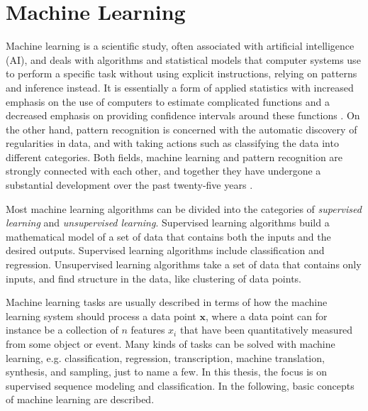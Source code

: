 \documentclass{scrartcl}
\begin{document}




\newpage

\section{Machine Learning}
\label{sec:machine_learning}

Machine learning is a scientific study, often associated with artificial intelligence (AI), and deals with algorithms and statistical models that computer systems use to perform a specific task without using explicit instructions, relying on patterns and inference instead. It is essentially a form of applied statistics with increased emphasis on the use of computers to estimate complicated functions and a decreased emphasis on providing confidence intervals around these functions \cite{Goodfellow2016}. On the other hand, pattern recognition is concerned with the automatic discovery of regularities in data, and with taking actions such as classifying the data into different categories. Both fields, machine learning and pattern recognition are strongly connected with each other, and together they have undergone a substantial development over the past twenty-five years \cite{Bishop2006}.

Most machine learning algorithms can be divided into the categories of \emph{supervised learning} and \emph{unsupervised learning}. Supervised learning algorithms build a mathematical model of a set of data that contains both the inputs and the desired outputs. Supervised learning algorithms include classification and regression. Unsupervised learning algorithms take a set of data that contains only inputs, and find structure in the data, like clustering of data points. 

Machine learning tasks are usually described in terms of how the machine learning system should process a data point $\mathbf x$, where a data point can for instance be a collection of $n$ features $x_i$ that have been quantitatively measured from some object or event. Many kinds of tasks can be solved with machine learning, e.g. classification, regression, transcription, machine translation, synthesis, and sampling, just to name a few. In this thesis, the focus is on supervised sequence modeling and classification. In the following, basic concepts of machine learning are described. 
\end{document}
